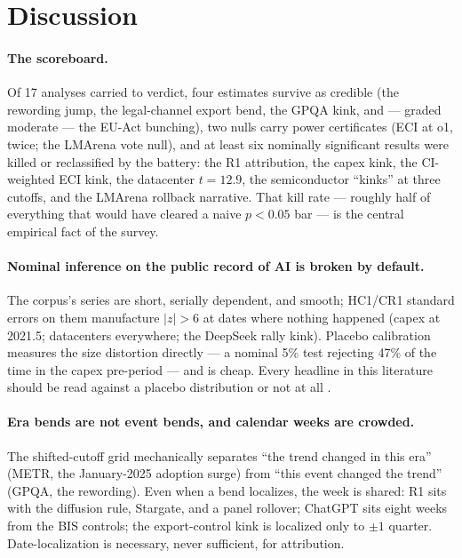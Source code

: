 \documentclass[11pt]{article}
\begin{document}
\section{Discussion}\label{sec:discussion}

\paragraph{The scoreboard.} Of 17 analyses carried to verdict, four
estimates survive as credible (the rewording jump, the legal-channel export
bend, the GPQA kink, and --- graded moderate --- the EU-Act bunching), two
nulls carry power certificates (ECI at o1, twice; the LMArena vote null),
and at least six nominally significant results were killed or reclassified
by the battery: the R1 attribution, the capex kink, the CI-weighted ECI
kink, the datacenter $t=12.9$, the semiconductor ``kinks'' at three
cutoffs, and the LMArena rollback narrative. That kill rate --- roughly half
of everything that would have cleared a naive $p<0.05$ bar --- is the
central empirical fact of the survey.

\paragraph{Nominal inference on the public record of AI is broken by
default.} The corpus's series are short, serially dependent, and smooth;
HC1/CR1 standard errors on them manufacture $|z|>6$ at dates where nothing
happened (capex at 2021.5; datacenters everywhere; the DeepSeek rally
kink). Placebo calibration measures the size distortion directly --- a
nominal 5\% test rejecting 47\% of the time in the capex pre-period --- and
is cheap. Every headline in this literature should be read against a
placebo distribution or not at all \cite{ganong2018,bertrand2004}.

\paragraph{Era bends are not event bends, and calendar weeks are crowded.}
The shifted-cutoff grid mechanically separates ``the trend changed in this
era'' (METR, the January-2025 adoption surge) from ``this event changed the
trend'' (GPQA, the rewording). Even when a bend localizes, the week is
shared: R1 sits with the diffusion rule, Stargate, and a panel rollover;
ChatGPT sits eight weeks from the BIS controls; the export-control kink is
localized only to $\pm 1$ quarter. Date-localization is necessary, never
sufficient, for attribution.
\end{document}
